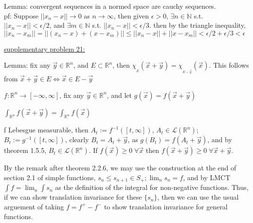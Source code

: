 \documentclass[12pt]{article}
\newcommand{\nats}[0] { \mathbb{N}}
\newcommand{\reals}[0] { \mathbb{R}}
\newcommand{\eps}[0] {  \epsilon }
\newcommand{\lrimply}[0] { \Leftrightarrow }
\begin{document}
\begin{flushleft}
Lemma: convergent sequences in a normed space are cauchy sequences.\\
pf: Suppose $||x_n - x|| \rightarrow 0$ as $n \rightarrow \infty$, then given $\eps > 0$, $\exists n \in \nats$ s.t. $||x_n - x|| < \eps/2$, and $\exists m \in \nats$ s.t. $||x_n - x|| < \eps/3$. then by the triangle inequality, $||x_n - x_m|| = ||(x_n - x) + (x- x_m)|| \le ||x_n - x|| + ||x - x_m|| < \eps /2 + \eps / 3 < \eps $ 
\end{flushleft}



\begin{flushleft}
\underline{supplementary problem 21:}
\end{flushleft}

\begin{flushleft}
Lemma: fix any $\vec{y} \in \reals^n$, and $E \subset \reals^n$, then $\chi_{_E}(\vec{x} + \vec{y}) = \chi_{_{E - \vec{y}}}(\vec{x} ) $. This follows from $\vec{x} + \vec{y} \in E \lrimply \vec{x} \in E - \vec{y}$
\end{flushleft}


\begin{flushleft}
$f:\reals^n \rightarrow [-\infty,\infty] $, fix any $\vec{y} \in \reals^n$, and let $g(\vec{x}) = f(\vec{x} + \vec{y})$ \\
\end{flushleft}

$ \int_{\reals^n} f(\vec{x} + \vec{y}) = \int_{\reals^n} f(\vec{x}) $ \\

\begin{flushleft}
f Lebesgue measurable, then $A_t := f^{-1}([t,\infty]) $, $ A_t \in \mathcal{L}(\reals^n)$; $B_t := g^{-1}([t,\infty])$, clearly $B_t = A_t + \vec{y}$, as $g(B_t) = f(A_t + \vec{y})$, and by theorem 1.5.5, $B_t \in \mathcal{L}(\reals^n)$. If $f(\vec{x}) \ge 0 \; \forall \vec{x}$ then $f(\vec{x}+\vec{y}) \ge 0 \; \forall \vec{x}+\vec{y}$. \\
\end{flushleft}

\begin{flushleft}
By the remark after theorem 2.2.6, we may use the construction at the end of section 2.1 of simple functions, $s_n \le s_{n+1} \in S_+; \lim_n s_n = f$, and by LMCT $\int f = \lim_n \int s_n$ as the definition of the integral for non-negative functions. Thus, if we can show translation invariance for these $ \{ s_n \}$, then we can use the usual arguement of taking $f = f^+ - f^-$ to show translation invariance for general functions.
\end{flushleft}
\end{document}
